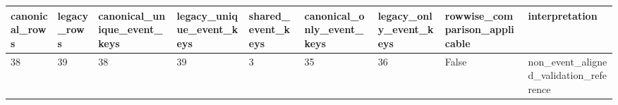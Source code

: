 \begin{tabular}{lllllllll}
\toprule
canonical\_rows & legacy\_rows & canonical\_unique\_event\_keys & legacy\_unique\_event\_keys & shared\_event\_keys & canonical\_only\_event\_keys & legacy\_only\_event\_keys & rowwise\_comparison\_applicable & interpretation \\
\midrule
38 & 39 & 38 & 39 & 3 & 35 & 36 & False & non\_event\_aligned\_validation\_reference \\
\bottomrule
\end{tabular}
